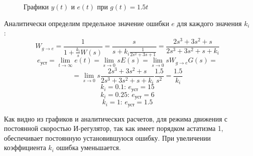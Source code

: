 \begin{figure}[H]
\begin{minipage}{0.45\textwidth}
    \end{minipage}
    \caption{Графики $y(t)$ и $e(t)$ при $g(t) = 1.5t$}
\end{figure}

Аналитически определим предельное значение ошибки $e$ для каждого значения $k_i$:
\[
W_{g\to e} = \frac{1}{1 + \frac{k_i}{s} W(s)}
= \frac{s}{s + k_i \frac{1}{2s^2 + 3s + 1}}
= \frac{2s^3 + 3s^2 + s}{2s^3 + 3s^2 + s + k_i}
\]
\[
e_{\text{уст}} = \lim_{t \to \infty} e(t)
= \lim_{s \to 0} s E(s)
= \lim_{s \to 0} s W_{g\to e} G(s) =
\]\[
= \lim_{s \to 0} s \frac{2s^3 + 3s^2 + s}{2s^3 + 3s^2 + s + k_i} \frac{1.5}{s^2}
= \frac{1.5}{k_i}
\]
\[
k_i = 0.1: \, e_{\text{уст}} = 15
\]
\[
k_i = 0.25: \, e_{\text{уст}} = 6
\]
\[
k_i = 1: \, e_{\text{уст}} = 1.5
\]

Как видно из графиков и аналитических расчетов, для режима движения с постоянной
скоростью И-регулятор, так как имеет порядком астатизма 1,
обеспечивает постоянную установившуюся ошибку. 
При увеличении коэффициента $k_i$ ошибка уменьшается.
\newpage

